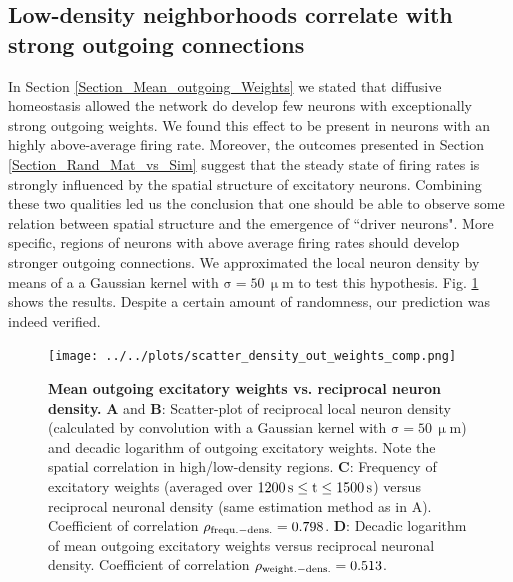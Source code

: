 \documentclass[10pt,letterpaper]{article}
\begin{document}
\subsection*{Low-density neighborhoods correlate with strong outgoing connections}
In Section \ref{Section_Mean_outgoing_Weights} we stated that diffusive homeostasis allowed the network do develop few neurons with exceptionally strong outgoing weights. We found this effect to be present in neurons with an highly above-average firing rate. Moreover, the outcomes presented in Section \ref{Section_Rand_Mat_vs_Sim} suggest that the steady state of firing rates is strongly influenced by the spatial structure of excitatory neurons. Combining these two qualities led us the conclusion that one should be able to observe some relation between spatial structure and the emergence of ``driver neurons". More specific, regions of neurons with above average firing rates should develop stronger outgoing connections. We approximated the local neuron density by means of a a Gaussian kernel with $\mathrm{\sigma = 50\, \upmu m}$ to test this hypothesis. Fig. \ref{Inverse_Dens_vs_Sum_Out_Weights} shows the results. Despite a certain amount of randomness, our prediction was indeed verified. 
\begin{figure}
\texttt{[image: ../../plots/scatter\_density\_out\_weights\_comp.png]}
\caption{{\bf Mean outgoing excitatory weights vs. reciprocal neuron density.} \textbf{A} and \textbf{B}: Scatter-plot of reciprocal local neuron density (calculated by convolution with a Gaussian kernel with $\mathrm{\sigma = 50\, \upmu m}$) and decadic logarithm of outgoing excitatory weights. Note the spatial correlation in high/low-density regions. \textbf{C}: Frequency of excitatory weights (averaged over $\rm 1200\,s \leq t \leq 1500\,s$) versus reciprocal neuronal density (same estimation method as in A). Coefficient of correlation $\rho_{\rm frequ.-dens.} = 0.798$. \textbf{D}: Decadic logarithm of mean outgoing excitatory weights versus reciprocal neuronal density. Coefficient of correlation $\rho_{\rm weight.-dens.} = 0.513$.}
\label{Inverse_Dens_vs_Sum_Out_Weights}
\end{figure}
\end{document}
